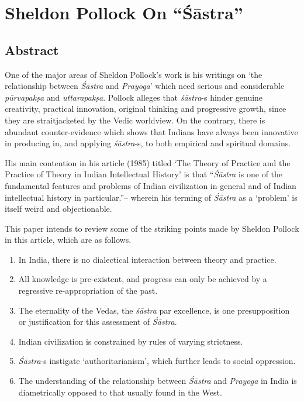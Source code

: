 \chapter{Sheldon Pollock On ``Śāstra''}\label{chapter9}
\vskip -10pt

\vskip -10pt

\section*{Abstract}

One of the major areas of Sheldon Pollock's work is his writings on `the relationship between {\it Śāstra} and {\it Prayoga}' which need serious and considerable {\it pūrvapakṣa} and {\it uttarapakṣa}. Pollock alleges that {\it śāstra}-s hinder genuine creativity, practical innovation, original thinking and progressive growth, since they are straitjacketed by the Vedic worldview. On the contrary, there is abundant counter-evidence which shows that Indians have always been innovative in producing in, and applying {\it śāstra}-s, to both empirical and spiritual domains. 


His main contention in his article (1985) titled `The Theory of Practice and the Practice of Theory in Indian Intellectual History' is that ``{\it Śāstra} is one of the fundamental features and problems of Indian civilization in general and of Indian intellectual history in particular.''-- wherein his terming of {\it Śāstra} as a `problem' is itself weird and objectionable.  

This paper intends to review some of the striking points made by Sheldon Pollock in this article, which are as follows.
\begin{enumerate}
\item In India, there is no dialectical interaction between theory and practice.

\item All knowledge is pre-existent, and progress can only be achieved by a regressive re-appropriation of the past.

\item The eternality of the Vedas, the {\it śāstra} par excellence, is one presupposition or justification for this assessment of {\it Śāstra}.

\item Indian civilization is constrained by rules of varying strictness.

\item {\it Śāstra}-s instigate `authoritarianism', which further leads to social oppression.

\item The understanding of the relationship between {\it Śāstra} and {\it Prayoga} in India is  diametrically opposed to that usually found in the West. 
\end{enumerate}

